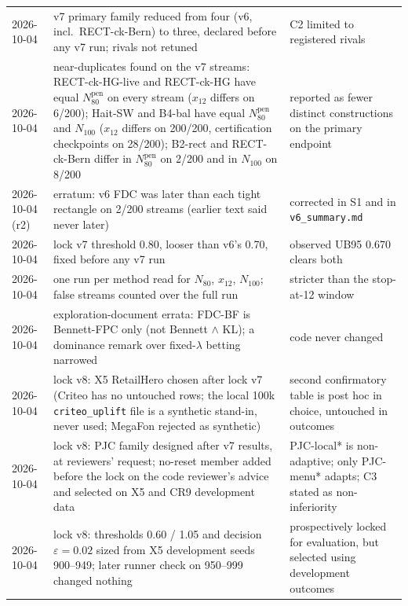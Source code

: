 \documentclass[sigconf,anonymous,review]{acmart}
\newcommand{\eps}{\varepsilon}
\newcommand{\Npen}{N_{80}^{\text{pen}}}
\begin{document}
\begin{table}[p]
\begin{tabular}{@{}l>{\raggedright\arraybackslash}p{6.6cm}>{\raggedright\arraybackslash}p{7.6cm}@{}}
2026-10-04 & v7 primary family reduced from four (v6, incl.\ RECT-ck-Bern) to three, declared before any v7 run; rivals not retuned & C2 limited to registered rivals \\
2026-10-04 & near-duplicates found on the v7 streams: RECT-ck-HG-live and RECT-ck-HG have equal $\Npen$ on every stream ($x_{12}$ differs on 6/200); Hait-SW and B4-bal have equal $\Npen$ and $N_{100}$ ($x_{12}$ differs on 200/200, certification checkpoints on 28/200); B2-rect and RECT-ck-Bern differ in $\Npen$ on 2/200 and in $N_{100}$ on 8/200 & reported as fewer distinct constructions on the primary endpoint \\
2026-10-04 (r2) & erratum: v6 FDC was later than each tight rectangle on 2/200 streams (earlier text said never later) & corrected in S1 and in \texttt{v6\_summary.md} \\
2026-10-04 & lock v7 threshold 0.80, looser than v6's 0.70, fixed before any v7 run & observed UB95 0.670 clears both \\
2026-10-04 & one run per method read for $N_{80}$, $x_{12}$, $N_{100}$; false streams counted over the full run & stricter than the stop-at-12 window \\
2026-10-04 & exploration-document errata: FDC-BF is Bennett-FPC only (not Bennett $\wedge$ KL); a dominance remark over fixed-$\lambda$ betting narrowed & code never changed \\
2026-10-04 & lock v8: X5 RetailHero chosen after lock v7 (Criteo has no untouched rows; the local 100k \texttt{criteo\_uplift} file is a synthetic stand-in, never used; MegaFon rejected as synthetic) & second confirmatory table is post hoc in choice, untouched in outcomes \\
2026-10-04 & lock v8: PJC family designed after v7 results, at reviewers' request; no-reset member added before the lock on the code reviewer's advice and selected on X5 and CR9 development data & PJC-local* is non-adaptive; only PJC-menu* adapts; C3 stated as non-inferiority \\
2026-10-04 & lock v8: thresholds 0.60 / 1.05 and decision $\eps = 0.02$ sized from X5 development seeds 900--949; later runner check on 950--999 changed nothing & prospectively locked for evaluation, but selected using development outcomes \\
\bottomrule
\end{tabular}
\end{table}
\end{document}
